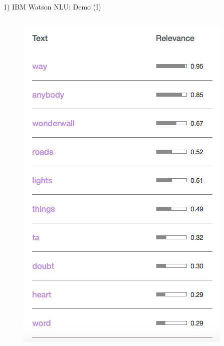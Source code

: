 \documentclass[xcolor=dvipsnames]{beamer}
\begin{document}
\begin{frame}{1) IBM Watson NLU: Demo (I)}
\begin{columns}
\begin{figure}
	\includegraphics[scale=0.25,left]{./images/keywords}
\end{figure}
\end{columns}
\end{frame}
\end{document}

